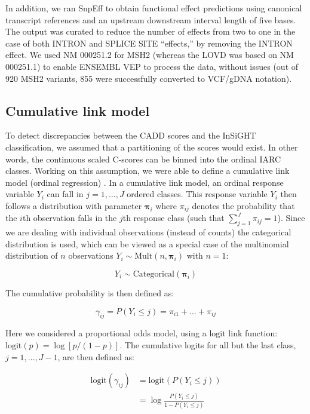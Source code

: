 In addition, we ran SnpEff to obtain functional effect predictions using canonical transcript references and an upstream downstream interval length of five bases. The output was curated to reduce the number of effects from two to one in the case of both INTRON and SPLICE SITE “effects,” by removing the INTRON effect. We used NM 000251.2 for MSH2 (whereas the LOVD was based on NM 000251.1) to enable ENSEMBL VEP to process the data, without issues (out of 920 MSH2 variants, 855 were successfully converted to VCF/gDNA notation).

\subsection{Cumulative link model}
To detect discrepancies between the CADD scores and the InSiGHT classification, we assumed that a partitioning of the scores would exist.
In other words, the continuous scaled C-scores can be binned into the ordinal IARC classes.
Working on this assumption, we were able to define a cumulative link model (ordinal regression) \cite{Agresti_2002,Mccullagh_1980}.
In a cumulative link model, an ordinal response variable $Y_i$ can fall in $j = 1,\ldots,J$ ordered classes.
This response variable $Y_i$ then follows a distribution with parameter $\bm{\pi}_i$ where $\pi_{ij}$ denotes the probability that the $i$th observation falls in the $j$th response class (such that $\sum^J_{j=1}\pi_{ij}=1$).
Since we are dealing with individual observations (instead of counts) the categorical distribution is used, which can be viewed as  a special case of the multinomial distribution of $n$ observations $Y_i \sim \text{Mult}(n,\bm{\pi}_i)$  with $n = 1$:

\begin{equation*}
Y_i \sim \text{Categorical}(\bm{\pi}_i)
\end{equation*}

\noindent The cumulative probability is then defined as:

\begin{equation*}
\gamma_{ij} = P(Y_i \le j) = \pi_{i1} + \ldots + \pi_{ij}
\end{equation*}

\noindent Here we considered a proportional odds model, using a $\text{logit}$ link function:  $\text{logit}(p) = \log[p/(1-p)]$.
The cumulative logits for all but the last class, $j = 1,\ldots,J - 1$, are then defined as:

\begin{align*}
\text{logit}(\gamma_{ij})
&=  \text{logit}(P(Y_i \le j)) \\
&=  \log{\frac{P(Y_i \le j)}{1 - P(Y_i \le j)}}
\end{align*}

